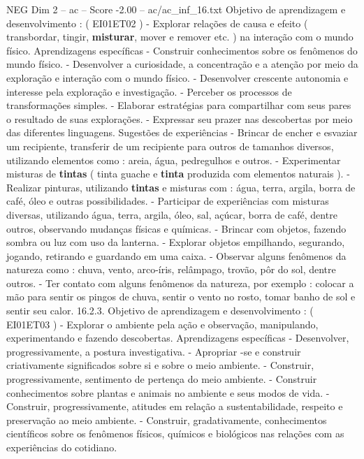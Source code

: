 \begin{textsample}{NEG Dim 2 – ac – Score -2.00 – ac/ac\_inf\_16.txt}
Objetivo de aprendizagem e desenvolvimento : ( EI01ET02 ) - Explorar relações de causa e efeito ( transbordar, tingir, \textbf{misturar}, mover e remover etc. ) na interação com o mundo físico.
Aprendizagens específicas - Construir conhecimentos sobre os fenômenos do mundo físico. - Desenvolver a curiosidade, a concentração e a atenção por meio da exploração e interação com o mundo físico. - Desenvolver crescente autonomia e interesse pela exploração e investigação. - Perceber os processos de transformações simples. - Elaborar estratégias para compartilhar com seus pares o resultado de suas explorações. - Expressar seu prazer nas descobertas por meio das diferentes linguagens.
Sugestões de experiências - Brincar de encher e esvaziar um recipiente, transferir de um recipiente para outros de tamanhos diversos, utilizando elementos como : areia, água, pedregulhos e outros. - Experimentar misturas de \textbf{tintas} ( tinta guache e \textbf{tinta} produzida com elementos naturais ). - Realizar pinturas, utilizando \textbf{tintas} e misturas com : água, terra, argila, borra de café, óleo e outras possibilidades. - Participar de experiências com misturas diversas, utilizando água, terra, argila, óleo, sal, açúcar, borra de café, dentre outros, observando mudanças físicas e químicas. - Brincar com objetos, fazendo sombra ou luz com uso da lanterna. - Explorar objetos empilhando, segurando, jogando, retirando e guardando em uma caixa. - Observar alguns fenômenos da natureza como : chuva, vento, arco-íris, relâmpago, trovão, pôr do sol, dentre outros. - Ter contato com alguns fenômenos da natureza, por exemplo : colocar a mão para sentir os pingos de chuva, sentir o vento no rosto, tomar banho de sol e sentir seu calor. 16.2.3.
Objetivo de aprendizagem e desenvolvimento : ( EI01ET03 ) - Explorar o ambiente pela ação e observação, manipulando, experimentando e fazendo descobertas.
Aprendizagens específicas - Desenvolver, progressivamente, a postura investigativa. - Apropriar -se e construir criativamente significados sobre si e sobre o meio ambiente. - Construir, progressivamente, sentimento de pertença do meio ambiente. - Construir conhecimentos sobre plantas e animais no ambiente e seus modos de vida. - Construir, progressivamente, atitudes em relação a sustentabilidade, respeito e preservação ao meio ambiente. - Construir, gradativamente, conhecimentos científicos sobre os fenômenos físicos, químicos e biológicos nas relações com as experiências do cotidiano.

\end{textsample}
